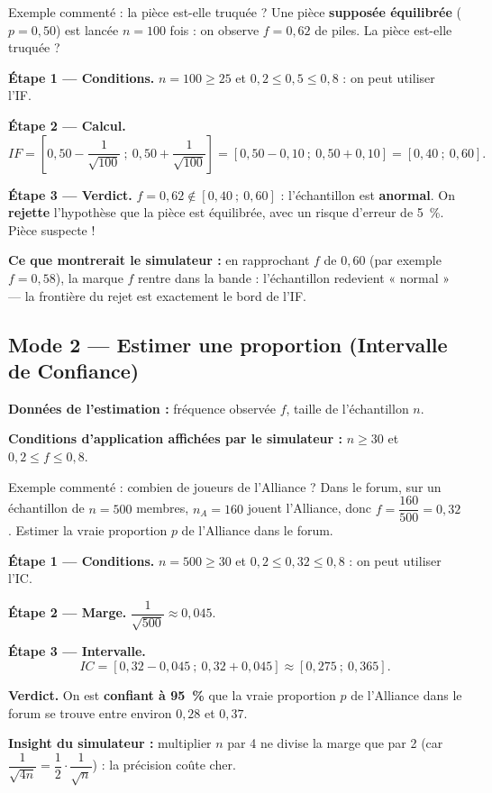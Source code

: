 \documentclass[11pt,a4paper]{article}
\newcommand{\IF}{\textit{IF}}
\newcommand{\IC}{\textit{IC}}
\begin{document}
	\begin{ficheoutils}{Exemple commenté : la pièce est-elle truquée ?}
		Une pièce \textbf{supposée équilibrée} ($p = 0{,}50$) est lancée
		$n = 100$ fois : on observe $f = 0{,}62$ de piles. La pièce est-elle truquée ?
		
		\medskip
		\textbf{Étape 1 — Conditions.} $n = 100 \geq 25$ \checkmark{} et
		$0{,}2 \leq 0{,}5 \leq 0{,}8$ \checkmark{} : on peut utiliser l'IF.
		
		\textbf{Étape 2 — Calcul.}
		\[
		\IF{} = \left[0{,}50 - \dfrac{1}{\sqrt{100}}\ ;\ 0{,}50 + \dfrac{1}{\sqrt{100}}\right]
		= \left[0{,}50 - 0{,}10\ ;\ 0{,}50 + 0{,}10\right]
		= \left[0{,}40\ ;\ 0{,}60\right].
		\]
		
		\textbf{Étape 3 — Verdict.} $f = 0{,}62 \notin \left[0{,}40\ ;\ 0{,}60\right]$ :
		l'échantillon est \textbf{anormal}. On \textbf{rejette} l'hypothèse que la pièce
		est équilibrée, avec un risque d'erreur de 5~\%. Pièce suspecte !
		
		\textbf{Ce que montrerait le simulateur :} en rapprochant $f$ de $0{,}60$ (par
		exemple $f = 0{,}58$), la marque $f$ rentre dans la bande : l'échantillon
		redevient « normal » — la frontière du rejet est exactement le bord de l'IF.
	\end{ficheoutils}
	
	\subsection{Mode 2 — Estimer une proportion (Intervalle de Confiance)}
	
	\textbf{Données de l'estimation :} fréquence observée $f$, taille de
	l'échantillon $n$.
	
	\begin{notebox}
		\textbf{Conditions d'application affichées par le simulateur :}
		$n \geq 30$ \quad et \quad $0{,}2 \leq f \leq 0{,}8$.
	\end{notebox}
	
	\begin{ficheoutils}{Exemple commenté : combien de joueurs de l'Alliance ?}
		Dans le forum, sur un échantillon de $n = 500$ membres, $n_A = 160$ jouent
		l'Alliance, donc $f = \dfrac{160}{500} = 0{,}32$. Estimer la vraie proportion
		$p$ de l'Alliance dans le forum.
		
		\medskip
		\textbf{Étape 1 — Conditions.} $n = 500 \geq 30$ \checkmark{} et
		$0{,}2 \leq 0{,}32 \leq 0{,}8$ \checkmark{} : on peut utiliser l'IC.
		
		\textbf{Étape 2 — Marge.} $\dfrac{1}{\sqrt{500}} \approx 0{,}045$.
		
		\textbf{Étape 3 — Intervalle.}
		\[
		\IC{} = \left[0{,}32 - 0{,}045\ ;\ 0{,}32 + 0{,}045\right]
		\approx \left[0{,}275\ ;\ 0{,}365\right].
		\]
		
		\textbf{Verdict.} On est \textbf{confiant à 95~\%} que la vraie proportion $p$
		de l'Alliance dans le forum se trouve entre environ $0{,}28$ et $0{,}37$.
		
		\textbf{Insight du simulateur :} multiplier $n$ par 4 ne divise la marge que
		par 2 (car $\dfrac{1}{\sqrt{4n}} = \dfrac{1}{2}\cdot\dfrac{1}{\sqrt{n}}$) :
		la précision coûte cher.
	\end{ficheoutils}
	
\end{document}
